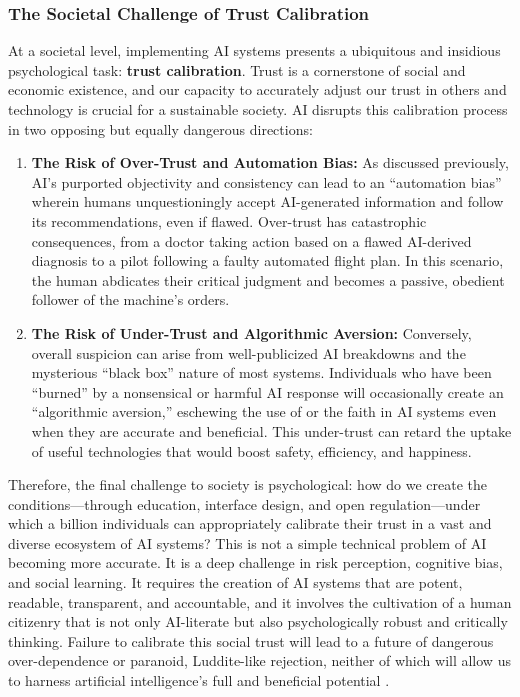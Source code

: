 \documentclass{article}
\begin{document}
\subsubsection{The Societal Challenge of Trust Calibration}
At a societal level, implementing AI systems presents a ubiquitous and insidious psychological task: \textbf{trust calibration}. Trust is a cornerstone of social and economic existence, and our capacity to accurately adjust our trust in others and technology is crucial for a sustainable society. AI disrupts this calibration process in two opposing but equally dangerous directions:
\begin{enumerate}
    \item \textbf{The Risk of Over-Trust and Automation Bias:} As discussed previously, AI's purported objectivity and consistency can lead to an “automation bias” wherein humans unquestioningly accept AI-generated information and follow its recommendations, even if flawed. Over-trust has catastrophic consequences, from a doctor taking action based on a flawed AI-derived diagnosis to a pilot following a faulty automated flight plan. In this scenario, the human abdicates their critical judgment and becomes a passive, obedient follower of the machine's orders.
    \item \textbf{The Risk of Under-Trust and Algorithmic Aversion:} Conversely, overall suspicion can arise from well-publicized AI breakdowns and the mysterious “black box” nature of most systems. Individuals who have been “burned” by a nonsensical or harmful AI response will occasionally create an “algorithmic aversion,” eschewing the use of or the faith in AI systems even when they are accurate and beneficial. This under-trust can retard the uptake of useful technologies that would boost safety, efficiency, and happiness.
\end{enumerate}
Therefore, the final challenge to society is psychological: how do we create the conditions—through education, interface design, and open regulation—under which a billion individuals can appropriately calibrate their trust in a vast and diverse ecosystem of AI systems? This is not a simple technical problem of AI becoming more accurate. It is a deep challenge in risk perception, cognitive bias, and social learning. It requires the creation of AI systems that are potent, readable, transparent, and accountable, and it involves the cultivation of a human citizenry that is not only AI-literate but also psychologically robust and critically thinking. Failure to calibrate this social trust will lead to a future of dangerous over-dependence or paranoid, Luddite-like rejection, neither of which will allow us to harness artificial intelligence's full and beneficial potential \citep{ref9}.
\end{document}
